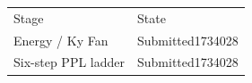 \begin{tabular}{ll}
Stage & State \\
Energy / Ky Fan & Submitted1734028 \\
Six-step PPL ladder & Submitted1734028 \\
\end{tabular}
